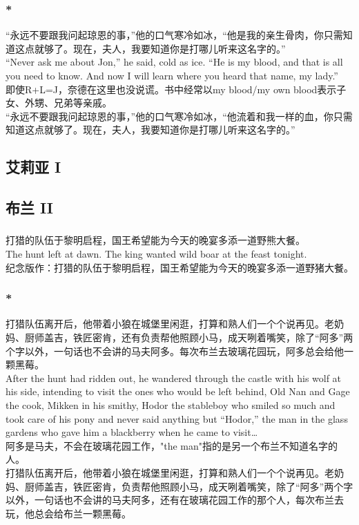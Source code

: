 \documentclass[12pt,a4paper]{article}
\newcommand{\h}[1]{{\color{red}#1}\\}
\newcommand{\la}[1]{{\color{blue}#1}\\}
\begin{document}
\subsubsection{\color{red}*}\label{1.6.1}\la{
“永远不要跟我问起琼恩的事，”他的口气寒冷如冰，“他是我的亲生骨肉，你只需知道这点就够了。现在，夫人，我要知道你是打哪儿听来这名字的。”\\
“Never ask me about Jon,” he said, cold as ice. “He is my blood, and that is all you need to know. And now I will learn where you heard that name, my lady.”}\h{
即使R+L=J，奈德在这里也没说谎。书中经常以my blood/my own blood表示子女、外甥、兄弟等亲戚。}
“永远不要跟我问起琼恩的事，”他的口气寒冷如冰，“他流着和我一样的血，你只需知道这点就够了。现在，夫人，我要知道你是打哪儿听来这名字的。”

\subsection{艾莉亚 I}
\subsection{布兰 II}
\subsubsection{}\la{
打猎的队伍于黎明启程，国王希望能为今天的晚宴多添一道野熊大餐。\\
The hunt left at dawn. The king wanted wild boar at the feast tonight.}
纪念版作：打猎的队伍于黎明启程，国王希望能为今天的晚宴多添一道野猪大餐。

\subsubsection{\color{red}*}\la{
打猎队伍离开后，他带着小狼在城堡里闲逛，打算和熟人们一个个说再见。老奶妈、厨师盖吉，铁匠密肯，还有负责帮他照顾小马，成天咧着嘴笑，除了“阿多”两个字以外，一句话也不会讲的马夫阿多。每次布兰去玻璃花园玩，阿多总会给他一颗黑莓。\\
After the hunt had ridden out, he wandered through the castle with his wolf at his side, intending to visit the ones who would be left behind, Old Nan and Gage the cook, Mikken in his smithy, Hodor the stableboy who smiled so much and took care of his pony and never said anything but “Hodor,” the man in the glass gardens who gave him a blackberry when he came to visit\ldots}
\h{阿多是马夫，不会在玻璃花园工作，"the man"指的是另一个布兰不知道名字的人。}
打猎队伍离开后，他带着小狼在城堡里闲逛，打算和熟人们一个个说再见。老奶妈、厨师盖吉，铁匠密肯，负责帮他照顾小马，成天咧着嘴笑，除了“阿多”两个字以外，一句话也不会讲的马夫阿多，还有在玻璃花园工作的那个人，每次布兰去玩，他总会给布兰一颗黑莓。
	
\end{document}
